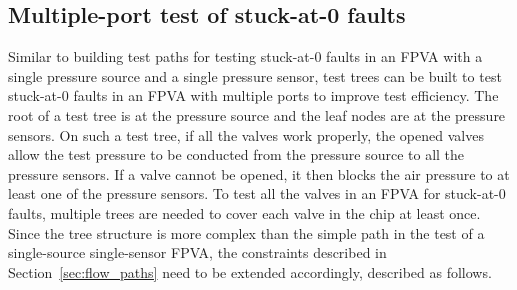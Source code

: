 %

\subsection{Multiple-port test of stuck-at-0 faults}
\label{sec:multiple_port_tree}

Similar to building test paths for testing stuck-at-0 faults in an FPVA with
a single pressure source and a single pressure sensor, 
test trees can be built to test stuck-at-0 faults 
in an FPVA with multiple ports to improve test efficiency. 
The root of a test tree is at the pressure source and 
the leaf nodes are at the pressure sensors.
On such a test tree, if all the valves work properly, the opened
valves allow the test pressure to be conducted from the pressure source to 
all the pressure sensors. 
If a valve cannot be opened, it then blocks the air pressure to at least one of
the pressure sensors. 
%
To test all the valves in an FPVA for stuck-at-0 faults, 
multiple trees are needed to cover each valve in the chip at least once.
Since the tree structure is more complex than the simple path in the test of
a single-source single-sensor FPVA, the constraints described in
Section~\ref{sec:flow_paths} need to be extended accordingly, described as
follows.

